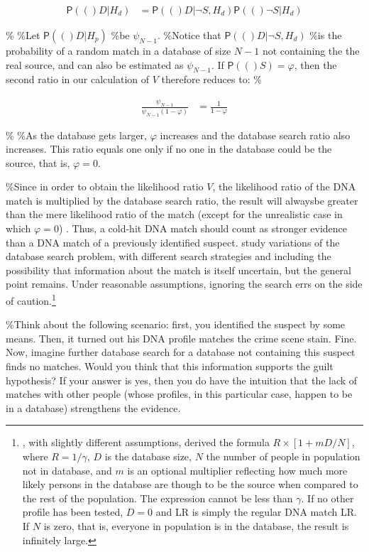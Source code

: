 \documentclass[10pt,dvipsnames,enabledeprecatedfontcommands]{scrartcl}
\newcommand{\pr}[1]{\mathsf{P}(#1)}
\begin{document}
\begin{align*}
\pr(D\vert H_d) & =  \pr(D\vert \neg S, H_d) \pr(\neg S \vert H_d)  
\end{align*}

\% \%Let \(\pr(D\vert H_p)\) \%be \(\psi_{N-1}\). \%Notice that
\(\pr(D\vert \neg S, H_d)\) \%is the probability of a random match in a
database of size \(N-1\) not containing the the real source, and can
also be estimated as \(\psi_{N-1}\).
If \(\pr(S)=\varphi\), then the second ratio in our calculation of \(V\)
therefore reduces to: \%

\begin{align*}
\frac{\psi_{N-1}}{\psi_{N-1}(1-\varphi)} & = \frac{1}{1-\varphi}
\end{align*}

\% \%As the database gets larger, \(\varphi\) increases and the database
search ratio also increases. This ratio equals one only if no one in the
database could be the source, that is, \(\varphi=0\).

\%Since in order to obtain the likelihood ratio \(V\), the likelihood
ratio of the DNA match is multiplied by the database search ratio, the
result will alwaysbe greater than the mere likelihood ratio of the match
(except for the unrealistic case in which \(\varphi=0\)) . Thus, a
cold-hit DNA match should count as stronger evidence than a DNA match of
a previously identified suspect.
\citet{dawid1996CoherentAnalysisForensic} study variations of the
database search problem, with different search strategies and including
the possibility that information about the match is itself uncertain,
but the general point remains. Under reasonable assumptions, ignoring
the search errs on the side of
caution.\footnote{\citet{donnelly1999DNADatabaseSearches}, with slightly different assumptions, derived the formula $R \times [1+mD/N]$, where $R = 1/\gamma$, $D$ is the database size, $N$ the number of people in population not in database, and $m$ is an optional multiplier reflecting how much more likely persons in the database are though to be the source when compared to the rest of the population. The expression cannot be less than $\gamma$. If no other profile has been tested, $D=0$ and LR is simply the regular DNA match LR. If $N$ is zero, that is, everyone in population is in the database, the result is infinitely large. }

\%Think about the following scenario: first, you identified the suspect
by some means. Then, it turned out his DNA profile matches the crime
scene stain. Fine. Now, imagine further database search for a database
not containing this suspect finds no matches. Would you think that this
information supports the guilt hypothesis? If your answer is yes, then
you do have the intuition that the lack of matches with other people
(whose profiles, in this particular case, happen to be in a database)
strengthens the evidence.
\end{document}
